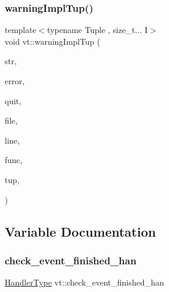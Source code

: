 \mbox{\label{namespacevt_af998935c41a6f414a373f182156d72e3}} 
\subsubsection{\texorpdfstring{warning\+Impl\+Tup()}{warningImplTup()}}
{\footnotesize\ttfamily template$<$typename Tuple , size\+\_\+t... I$>$ \\
void vt\+::warning\+Impl\+Tup (\begin{DoxyParamCaption}\item[{std\+::string const \&}]{str,  }\item[{\hyperlink{namespacevt_a793764d753923abc3d32929870beb485}{Error\+Code\+Type}}]{error,  }\item[{bool}]{quit,  }\item[{std\+::string const \&}]{file,  }\item[{int const}]{line,  }\item[{std\+::string const \&}]{func,  }\item[{Tuple \&\&}]{tup,  }\item[{std\+::index\+\_\+sequence$<$ I... $>$}]{ }\end{DoxyParamCaption})\hspace{0.3cm}{\ttfamily [inline]}}



\subsection{Variable Documentation}
\mbox{\label{namespacevt_a9764c5fa4f463d23a7db5d56cc121881}} 
\subsubsection{\texorpdfstring{check\+\_\+event\+\_\+finished\+\_\+han}{check\_event\_finished\_han}}
{\footnotesize\ttfamily \hyperlink{namespacevt_af64846b57dfcaf104da3ef6967917573}{Handler\+Type} vt\+::check\+\_\+event\+\_\+finished\+\_\+han}

\mbox{\label{namespacevt_a07abc8f1752a784f54c226bbc4c3b1fe}} 
